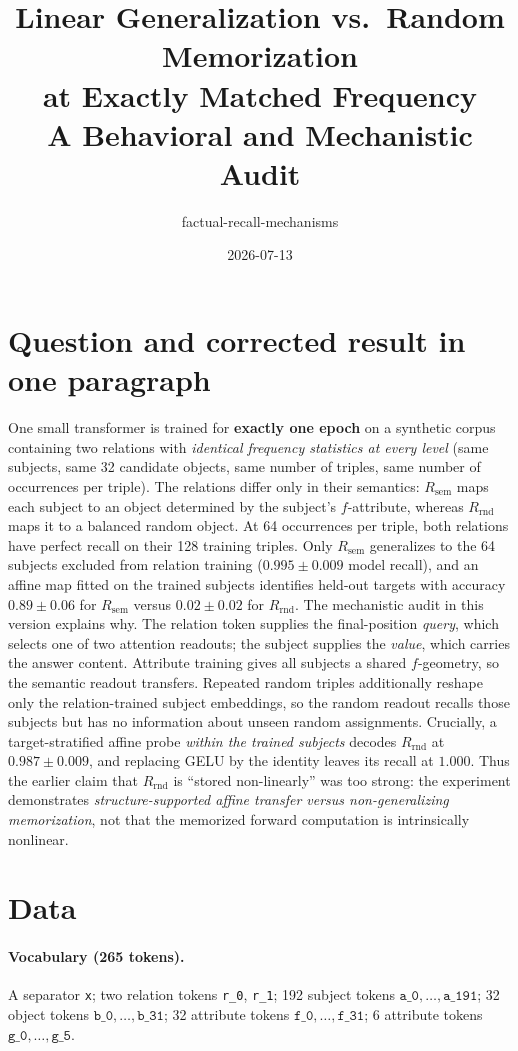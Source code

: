\documentclass[11pt]{article}
\title{Linear Generalization vs.\ Random Memorization\\ at Exactly Matched Frequency\\
\large A Behavioral and Mechanistic Audit}
\author{factual-recall-mechanisms}
\date{2026-07-13}
\newcommand{\sep}{\texttt{x}}
\newcommand{\subj}[1]{\texttt{a\_#1}}
\newcommand{\obj}[1]{\texttt{b\_#1}}
\newcommand{\rel}[1]{\texttt{r\_#1}}
\newcommand{\fatt}[1]{\texttt{f\_#1}}
\newcommand{\gatt}[1]{\texttt{g\_#1}}
\newcommand{\Rsem}{R_{\mathrm{sem}}}
\newcommand{\Rrnd}{R_{\mathrm{rnd}}}
\begin{document}
\maketitle

\section{Question and corrected result in one paragraph}

One small transformer is trained for \textbf{exactly one epoch} on a synthetic corpus containing two relations with \emph{identical frequency statistics at every level} (same subjects, same 32 candidate objects, same number of triples, same number of occurrences per triple). The relations differ only in their semantics: $\Rsem$ maps each subject to an object determined by the subject's $f$-attribute, whereas $\Rrnd$ maps it to a balanced random object. At 64 occurrences per triple, both relations have perfect recall on their 128 training triples. Only $\Rsem$ generalizes to the 64 subjects excluded from relation training ($0.995 \pm 0.009$ model recall), and an affine map fitted on the trained subjects identifies held-out targets with accuracy $0.89 \pm 0.06$ for $\Rsem$ versus $0.02 \pm 0.02$ for $\Rrnd$. The mechanistic audit in this version explains why. The relation token supplies the final-position \emph{query}, which selects one of two attention readouts; the subject supplies the \emph{value}, which carries the answer content. Attribute training gives all subjects a shared $f$-geometry, so the semantic readout transfers. Repeated random triples additionally reshape only the relation-trained subject embeddings, so the random readout recalls those subjects but has no information about unseen random assignments. Crucially, a target-stratified affine probe \emph{within the trained subjects} decodes $\Rrnd$ at $0.987 \pm 0.009$, and replacing GELU by the identity leaves its recall at $1.000$. Thus the earlier claim that $\Rrnd$ is ``stored non-linearly'' was too strong: the experiment demonstrates \emph{structure-supported affine transfer versus non-generalizing memorization}, not that the memorized forward computation is intrinsically nonlinear.

\section{Data}

\paragraph{Vocabulary (265 tokens).}
A separator \sep; two relation tokens \rel{0}, \rel{1}; 192 subject tokens $\subj{0},\dots,\subj{191}$; 32 object tokens $\obj{0},\dots,\obj{31}$; 32 attribute tokens $\fatt{0},\dots,\fatt{31}$; 6 attribute tokens $\gatt{0},\dots,\gatt{5}$.
\end{document}
